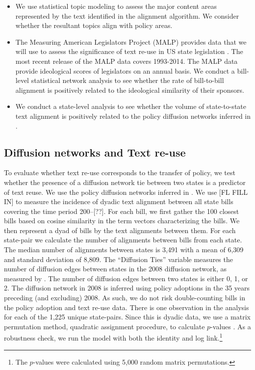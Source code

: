 \documentclass[12pt]{article} %
\begin{document}
\begin{itemize}
\item We use statistical topic modeling to assess the major content areas represented by the text identified in the alignment algorithm. We consider whether the resultant topics align with policy areas.
\item The Measuring American Legislators Project (MALP) provides data that we will use to assess the significance of text re-use in US state legislation \citet{shor2011}. The most recent release of the MALP data covers 1993-2014. The MALP data provide ideological scores of legislators on an annual basis. We conduct a bill-level statistical network analysis to see whether the rate of bill-to-bill alignment is positively related to the ideological similarity of their sponsors.
\item We conduct a state-level analysis to see whether the volume of state-to-state text alignment is positively related to the policy diffusion networks inferred in \citet{desmarais2015}.
\end{itemize}

\subsection{Diffusion networks and Text re-use}

To evaluate whether text re-use corresponds to the transfer of policy, we test whether the presence of a diffusion network tie between two states is a predictor of text reuse. We use the policy diffusion networks inferred in \citet{desmarais2015}. We use [FL FILL IN] to measure the incidence of dyadic text alignment between all state bills covering the time period 200--[??]. For each bill, we first gather the 100 closest bills based on cosine similarity in the term vectors characterizing the bills. We then represent a dyad of bills by the text alignments between them. For each state-pair we calculate the number of alignments between bills from each state. The median number of alignments between states is 3,491 with a mean of 6,309 and standard deviation of 8,809. The ``Diffusion Ties'' variable measures the number of diffusion edges between states in the 2008 diffusion network, as measured by \citet{desmarais2015}. The number of diffusion edges between two states is either 0, 1, or 2. The diffusion network in 2008 is inferred using policy adoptions in the 35 years preceding (and excluding) 2008. As such, we do not risk double-counting bills in the policy adoption and text re-use data. There is one observation in the analysis for each of the 1,225 unique state-pairs. Since this is dyadic data, we use a matrix permutation method, quadratic assignment procedure, to calculate $p$-values \citep{krackhardt1988}. As a robustness check, we run the model with both the identity and log link.\footnote{The $p$-values were calculated using 5,000 random matrix permutations.}
\end{document}
